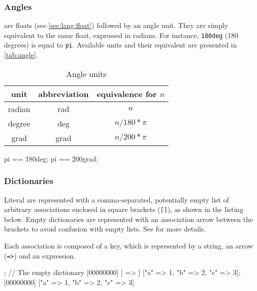\subsubsection{Angles}

 are floats (see \autoref{sec:lang:float}) followed by an
angle unit. They are simply equivalent to the same float, expressed in
radians. For instance, \lstinline|180deg| (180 degrees) is equal to
\lstinline{pi}. Available units and their equivalent are presented in
\autoref{tab:angle}.

\begin{table}[\floatposh]
  \centering
  \begin{tabular}{|c|c|c|}
    \hline
    unit        & abbreviation & equivalence for $n$  \\
    \hline
    radian      & rad          & $n$         \\
    degree      & deg          & $n / 180 * \pi$        \\
    grad        & grad         & $n / 200 * \pi$        \\
    \hline
  \end{tabular}
  \caption{Angle units}
  \label{tab:angle}
\end{table}

\begin{urbiassert}
pi == 180deg;
pi == 200grad;
\end{urbiassert}

\subsubsection{Dictionaries}
\label{sec:lang:dictionary}


Literal  are represented with a comma-separated,
potentially empty list of arbitrary associations enclosed in square brackets
(\lstinline|[]|), as shown in the listing below.  Empty dictionaries are
represented with an association arrow between the brackets to avoid
confusion with empty lists.  See  for more details.

Each association is composed of a key, which is represented by a string, an
arrow (\lstinline|=>|) and an expression.

\begin{urbiscript}
[ => ]; // The empty dictionary
[00000000] [ => ]
["a" => 1, "b" => 2, "c" => 3];
[00000000] ["a" => 1, "b" => 2, "c" => 3]
\end{urbiscript}

